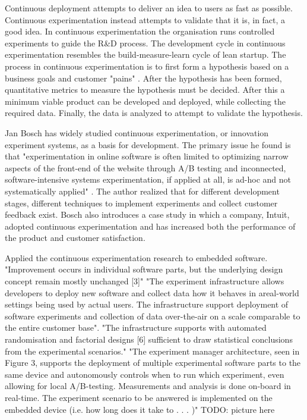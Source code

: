 \documentclass[english]{tktltiki2}
\theoremstyle{definition}
\theoremstyle{remark}
\begin{document}
Continuous deployment attempts to deliver an idea to users as fast as possible. Continuous experimentation instead attempts to validate that it is, in fact, a good idea. In continuous experimentation the organisation runs controlled experiments to guide the R\&D process. The development cycle in continuous experimentation resembles the build-measure-learn cycle of lean startup. The process in continuous experimentation is to first form a hypothesis based on a business goals and customer "pains" \cite{bosch2012building}. After the hypothesis has been formed, quantitative metrics to measure the hypothesis must be decided. After this a minimum viable product can be developed and deployed, while collecting the required data. Finally, the data is analyzed to attempt to validate the hypothesis.

Jan Bosch has widely studied continuous experimentation, or innovation experiment systems, as a basis for development. The primary issue he found is that "experimentation in online software is often limited to optimizing narrow aspects of the front-end of the website through A/B testing and inconnected, software-intensive systems experimentation, if applied at all, is ad-hoc and not systematically applied" \cite{bosch2012building}. The author realized that for different development stages, different techniques to implement experiments and collect customer feedback exist. Bosch also introduces a case study in which a company, Intuit, adopted continuous experimentation and has increased both the performance of the product and customer satisfaction.

\cite{eklund2012architecture}
Applied the continuous experimentation research to embedded software.
"Improvement occurs in individual software parts, but the underlying design concept remain mostly unchanged [3]"
"The experiment infrastructure allows developers to deploy new software and collect data how it behaves in areal-world settings being used by actual users. The infrastructure support deployment of software experiments and collection of data over-the-air on a scale comparable to the entire customer base". 
"The infrastructure supports with automated randomisation and factorial designs [6] sufficient to draw statistical conclusions from the experimental scenarios."
"The experiment manager architecture, seen in Figure 3, supports the deployment of multiple experimental software parts to the same device and autonomously controls when to run which experiment, even allowing for local A/B-testing. Measurements and analysis is done on-board in real-time. The experiment scenario to be answered is implemented on the embedded device (i.e. how long does it take to . . . )"
TODO: picture here
\end{document}
